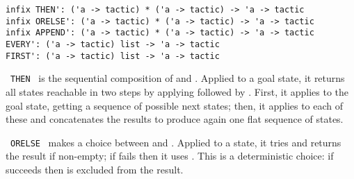 \begin{isabellebody}
\begin{isamarkuptext}
\begin{mldecls}
  \verb|infix THEN': ('a -> tactic) * ('a -> tactic) -> 'a -> tactic| \\
  \verb|infix ORELSE': ('a -> tactic) * ('a -> tactic) -> 'a -> tactic| \\
  \verb|infix APPEND': ('a -> tactic) * ('a -> tactic) -> 'a -> tactic| \\
  \verb|EVERY': ('a -> tactic) list -> 'a -> tactic| \\
  \verb|FIRST': ('a -> tactic) list -> 'a -> tactic| \\
  \end{mldecls}

  \begin{description}

  \item {}~\verb|THEN|~ is the sequential
  composition of  and .  Applied to a goal
  state, it returns all states reachable in two steps by applying
   followed by .  First, it applies  to the goal state, getting a sequence of possible next
  states; then, it applies  to each of these and
  concatenates the results to produce again one flat sequence of
  states.

  \item {}~\verb|ORELSE|~ makes a choice
  between  and .  Applied to a state, it
  tries  and returns the result if non-empty; if  fails then it uses .  This is a deterministic
  choice: if  succeeds then  is excluded
  from the result.


\end{description}
\end{isamarkuptext}
\end{isabellebody}
